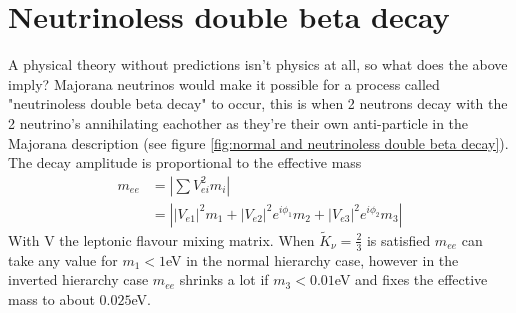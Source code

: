\documentclass[twoside,twocolumn,11pt]{article} %
\begin{document}
\section{Neutrinoless double beta decay}
A physical theory without predictions isn't physics at all, so what does the above imply? Majorana neutrinos would make it possible for a process called "neutrinoless double beta decay" to occur, this is when 2 neutrons decay with the 2 neutrino's annihilating eachother as they're their own anti-particle in the Majorana description (see figure \ref{fig:normal and neutrinoless double beta decay}). The decay amplitude is proportional to the effective mass
\begin{align}
	m_{ee} &= \left|\sum V_{ei}^2 m_i\right|\\
	&= \left||V_{e1}|^2m_1 + |V_{e2}|^2e^{i\phi_1}m_2 + |V_{e3}|^2e^{i\phi_2}m_3\right|
\end{align}
With V the leptonic flavour mixing matrix. When $\tilde{K}_\nu=\frac{2}{3}$ is satisfied $m_{ee}$ can take any value for $m_1 < 1$eV in the normal hierarchy case, however in the inverted hierarchy case $m_{ee}$ shrinks a lot if $m_3 < 0.01$eV and fixes the effective mass to about $0.025$eV.
\end{document}

